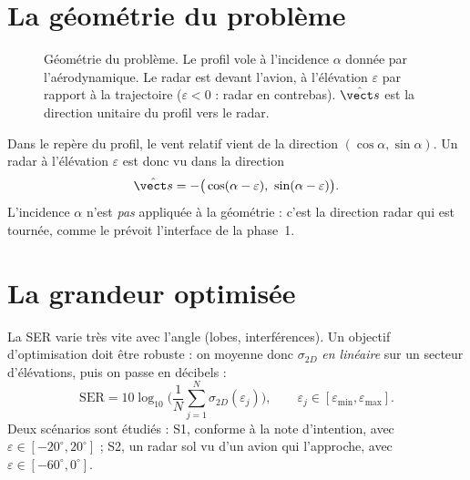 \section{La géométrie du problème}
\begin{figure}[htbp]
\centering
{}
\caption{Géométrie du problème. Le profil vole à l'incidence $\alpha$ donnée par l'aérodynamique. Le radar est devant l'avion, à l'élévation $\varepsilon$ par rapport à la trajectoire ($\varepsilon<0$ : radar en contrebas). $\shat$ est la direction unitaire du profil vers le radar.}\label{fig:geometrie}
\end{figure}

Dans le repère du profil, le vent relatif vient de la direction $(\cos\alpha,\sin\alpha)$. Un radar à l'élévation $\varepsilon$ est donc vu dans la direction
\[
\shat=-\big(\cos(\alpha-\varepsilon),\ \sin(\alpha-\varepsilon)\big).
\]
L'incidence $\alpha$ n'est \emph{pas} appliquée à la géométrie : c'est la direction radar qui est tournée, comme le prévoit l'interface de la phase~1.

\section{La grandeur optimisée}
La SER varie très vite avec l'angle (lobes, interférences). Un objectif d'optimisation doit être robuste : on moyenne donc $\sigma_{2D}$ \emph{en linéaire} sur un secteur d'élévations, puis on passe en décibels :
\[
\mathrm{SER}=10\log_{10}\Big(\frac{1}{N}\sum_{j=1}^N\sigma_{2D}(\varepsilon_j)\Big),\qquad \varepsilon_j\in[\varepsilon_{\min},\varepsilon_{\max}].
\]
Deux scénarios sont étudiés : S1, conforme à la note d'intention, avec $\varepsilon\in[-20^\circ,20^\circ]$ ; S2, un radar sol vu d'un avion qui l'approche, avec $\varepsilon\in[-60^\circ,0^\circ]$.

